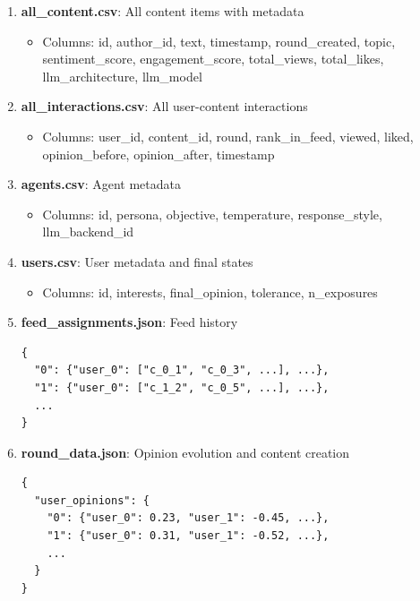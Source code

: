 \documentclass[11pt]{article}
\begin{document}
\begin{enumerate}
    \item \textbf{all\_content.csv}: All content items with metadata
    \begin{itemize}
        \item Columns: id, author\_id, text, timestamp, round\_created, topic, sentiment\_score, engagement\_score, total\_views, total\_likes, llm\_architecture, llm\_model
    \end{itemize}

    \item \textbf{all\_interactions.csv}: All user-content interactions
    \begin{itemize}
        \item Columns: user\_id, content\_id, round, rank\_in\_feed, viewed, liked, opinion\_before, opinion\_after, timestamp
    \end{itemize}

    \item \textbf{agents.csv}: Agent metadata
    \begin{itemize}
        \item Columns: id, persona, objective, temperature, response\_style, llm\_backend\_id
    \end{itemize}

    \item \textbf{users.csv}: User metadata and final states
    \begin{itemize}
        \item Columns: id, interests, final\_opinion, tolerance, n\_exposures
    \end{itemize}

    \item \textbf{feed\_assignments.json}: Feed history
    \begin{lstlisting}[basicstyle=\small\ttfamily]
{
  "0": {"user_0": ["c_0_1", "c_0_3", ...], ...},
  "1": {"user_0": ["c_1_2", "c_0_5", ...], ...},
  ...
}
    \end{lstlisting}

    \item \textbf{round\_data.json}: Opinion evolution and content creation
    \begin{lstlisting}[basicstyle=\small\ttfamily]
{
  "user_opinions": {
    "0": {"user_0": 0.23, "user_1": -0.45, ...},
    "1": {"user_0": 0.31, "user_1": -0.52, ...},
    ...
  }
}
    \end{lstlisting}
\end{enumerate}
\end{document}

